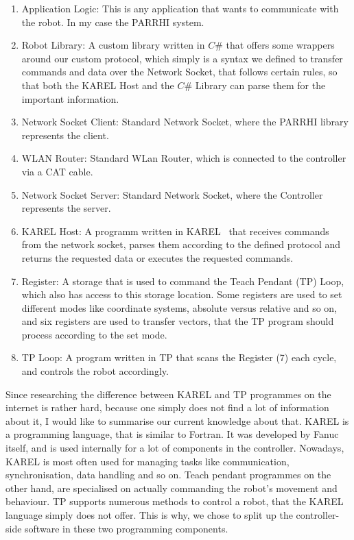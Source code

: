 \begin{enumerate}
	\item Application Logic: This is any application that wants to communicate with the robot. In my case the PARRHI system.
	\item Robot Library: A custom library written in $C\#$ that offers some wrappers around our custom protocol, which simply is a syntax we defined to transfer commands and data over the Network Socket, that follows certain rules, so that both the KAREL Host and the $C\#$ Library can parse them for the important information.
	\item Network Socket Client: Standard Network Socket, where the PARRHI library represents the client.
	\item WLAN Router: Standard WLan Router, which is connected to the controller via a CAT cable.
	\item Network Socket Server: Standard Network Socket, where the Controller represents the server.
	\item KAREL Host: A programm written in KAREL~\cite{FanucKarel} that receives commands from the network socket, parses them according to the defined protocol and returns the requested data or executes the requested commands.
	\item Register: A storage that is used to command the Teach Pendant (TP) Loop, which also has access to this storage location. Some registers are used to set different modes like coordinate systems, absolute versus relative and so on, and six registers are used to transfer vectors, that the TP program should process according to the set mode.
	\item TP Loop: A program written in TP that scans the Register (7) each cycle, and controls the robot accordingly.
\end{enumerate}


Since researching the difference between KAREL and TP programmes on the internet is rather hard, because one simply does not find a lot of information about it, I would like to summarise our current knowledge about that. KAREL is a programming language, that is similar to Fortran. It was developed by Fanuc itself, and is used internally for a lot of components in the controller. Nowadays, KAREL is most often used for managing tasks like communication, synchronisation, data handling and so on. Teach pendant programmes on the other hand, are specialised on actually commanding the robot's movement and behaviour. TP supports numerous methods to control a robot, that the KAREL language simply does not offer. This is why, we chose to split up the controller-side software in these two programming components.


